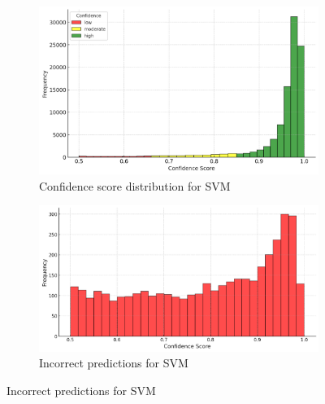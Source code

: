 \begin{figure}[H]
    \centering
    \begin{subfigure}[t]{0.45\textwidth}
        \centering
        \includegraphics[width=\textwidth]{./figures/confidence_baseline.png}
        \caption{Confidence score distribution for SVM}
        \label{fig:confidence_base}
    \end{subfigure}
    \hfill
    \begin{subfigure}[t]{0.45\textwidth}
        \centering
        \includegraphics[width=\textwidth]{./figures/wrong_svm.png}
        \caption{Incorrect predictions for SVM}
        \label{fig:incorrect_svm}
    \end{subfigure}

    \vspace{1em}


\end{figure}
